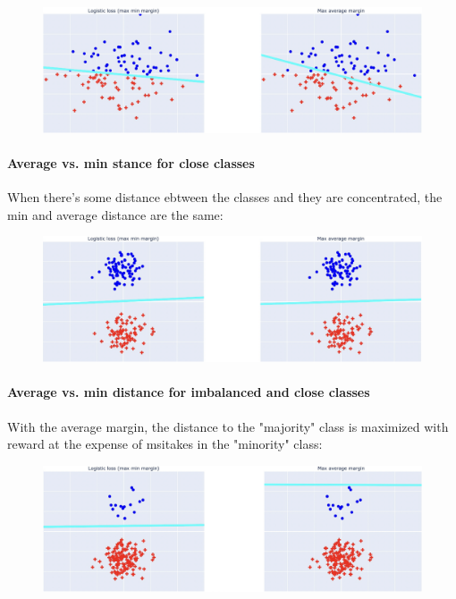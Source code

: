 \documentclass[a4paper]{extarticle}
\begin{document}
\begin{figure}[H]
    \includegraphics[width=15cm]{../images/IntroML_Fig4-8}
    \centering
\end{figure}

\paragraph{Average vs. min stance for close classes} When there's some distance ebtween the classes and they are concentrated, the min and average distance are the same:

\begin{figure}[H]
    \includegraphics[width=15cm]{../images/IntroML_Fig4-9}
    \centering
\end{figure}

\paragraph{Average vs. min distance for imbalanced and close classes} With the average margin, the distance to the "majority" class is maximized with reward at the expense of msitakes in the "minority" class:

\begin{figure}[H]
    \includegraphics[width=15cm]{../images/IntroML_Fig4-10}
    \centering
\end{figure}
\end{document}
